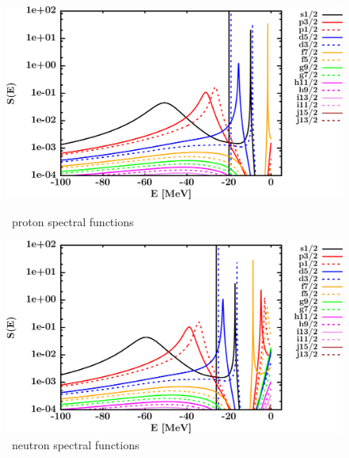 \begin{figure}[hbtp]
    \centering
    \begin{minipage}{0.42\textwidth}
        \centering
        \includegraphics[width=\textwidth]{figures/ca40_protonSpectralFunctions.png}
        \caption*{\caForty\ proton spectral functions}
        \label{DOMFitData_ca40_proton_spectralFunctions}
    \end{minipage}\hspace{6pt}
    \begin{minipage}{0.42\textwidth}
        \centering
        \includegraphics[width=\linewidth]{figures/ca40_neutronSpectralFunctions.png}
        \caption*{\caForty\ neutron spectral functions}
        \label{DOMFitData_ca40_neutron_spectralFunctions}
    \end{minipage}
\end{figure}

